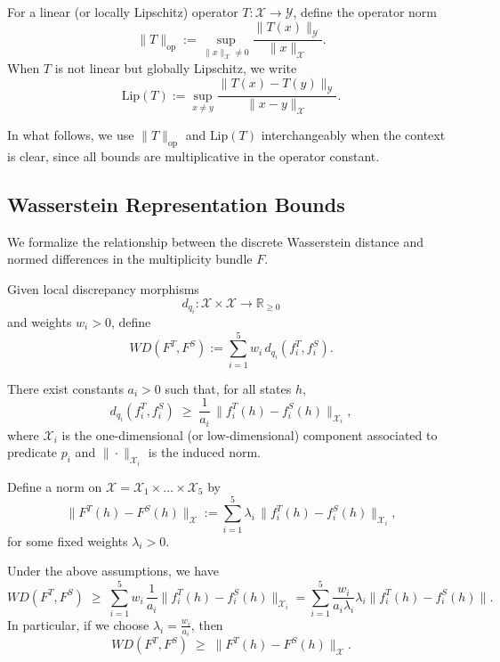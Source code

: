 \documentclass[11pt]{article}
\theoremstyle{definition}
\theoremstyle{plain}
\theoremstyle{remark}
\begin{document}
\begin{adefn}
For a linear (or locally Lipschitz) operator \(T: \mathcal{X} \to \mathcal{Y}\), define the operator norm
\[
  \|T\|_{\text{op}} := \sup_{\|x\|_{\mathcal{X}} \neq 0} \frac{\|T(x)\|_{\mathcal{Y}}}{\|x\|_{\mathcal{X}}}.
\]
When \(T\) is not linear but globally Lipschitz, we write
\[
  \text{Lip}(T) := \sup_{x\neq y} \frac{\|T(x)-T(y)\|_{\mathcal{Y}}}{\|x-y\|_{\mathcal{X}}}.
\]
\end{adefn}

In what follows, we use \(\|T\|_{\text{op}}\) and \(\text{Lip}(T)\) interchangeably when the context is clear, since all bounds are multiplicative in the operator constant.

\subsection{Wasserstein Representation Bounds}

We formalize the relationship between the discrete Wasserstein distance and normed differences in the multiplicity bundle \(F\).

\begin{adefn}
Given local discrepancy morphisms
\[
  d_{q_i} : \mathcal{X} \times \mathcal{X} \to \mathbb{R}_{\ge 0}
\]
and weights \(w_i>0\), define
\[
  WD(F^T,F^S) := \sum_{i=1}^{5} w_i\, d_{q_i}(f_i^T,f_i^S).
\]
\end{adefn}

\begin{aassump}
There exist constants \(a_i>0\) such that, for all states \(h\),
\[
  d_{q_i}(f_i^T,f_i^S) \;\ge\; \frac{1}{a_i}\,\|f_i^T(h)-f_i^S(h)\|_{\mathcal{X}_i},
\]
where \(\mathcal{X}_i\) is the one-dimensional (or low-dimensional) component associated to predicate \(p_i\) and \(\|\cdot\|_{\mathcal{X}_i}\) is the induced norm.
\end{aassump}

\begin{adefn}
Define a norm on \(\mathcal{X} = \mathcal{X}_1 \times \dots \times \mathcal{X}_5\) by
\[
  \|F^T(h) - F^S(h)\|_{\mathcal{X}}
  :=
  \sum_{i=1}^5 \lambda_i\, \|f_i^T(h)-f_i^S(h)\|_{\mathcal{X}_i},
\]
for some fixed weights \(\lambda_i>0\).
\end{adefn}

\begin{alem}
Under the above assumptions, we have
\[
  WD(F^T,F^S)
  \;\ge\;
  \sum_{i=1}^5 w_i\,\frac{1}{a_i} \|f_i^T(h)-f_i^S(h)\|_{\mathcal{X}_i}
  =
  \sum_{i=1}^5 \frac{w_i}{a_i \lambda_i} \lambda_i \|f_i^T(h)-f_i^S(h)\|.
\]
In particular, if we choose \(\lambda_i = \frac{w_i}{a_i}\), then
\[
  WD(F^T,F^S)
  \;\ge\;
  \|F^T(h)-F^S(h)\|_{\mathcal{X}}.
\]
\end{alem}
\end{document}
